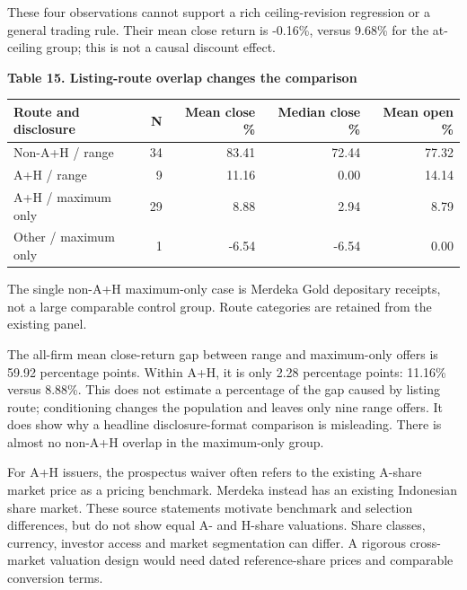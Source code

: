 \documentclass[10pt,a4paper]{article}
\begin{document}
{\footnotesize These four observations cannot support a rich ceiling-revision regression or a general trading rule. Their mean close return is -0.16\%, versus 9.68\% for the at-ceiling group; this is not a causal discount effect.}\par

\par\addvspace{5pt}\textbf{Table 15. Listing-route overlap changes the comparison}\par\nobreak\vspace{2pt}

{\small\renewcommand{\arraystretch}{1.10}\begin{tabularx}{\textwidth}{@{}Xrrrr@{}}\toprule

\textbf{Route and disclosure} & \textbf{N} & \textbf{Mean close \%} & \textbf{Median close \%} & \textbf{Mean open \%} \\\midrule

Non-A+H / range & 34 & 83.41 & 72.44 & 77.32 \\

A+H / range & 9 & 11.16 & 0.00 & 14.14 \\

A+H / maximum only & 29 & 8.88 & 2.94 & 8.79 \\

Other / maximum only & 1 & -6.54 & -6.54 & 0.00 \\

\bottomrule\end{tabularx}}\par

{\footnotesize The single non-A+H maximum-only case is Merdeka Gold depositary receipts, not a large comparable control group. Route categories are retained from the existing panel.}\par

The all-firm mean close-return gap between range and maximum-only offers is 59.92 percentage points. Within A+H, it is only 2.28 percentage points: 11.16\% versus 8.88\%. This does not estimate a percentage of the gap caused by listing route; conditioning changes the population and leaves only nine range offers. It does show why a headline disclosure-format comparison is misleading. There is almost no non-A+H overlap in the maximum-only group.

For A+H issuers, the prospectus waiver often refers to the existing A-share market price as a pricing benchmark. Merdeka instead has an existing Indonesian share market. These source statements motivate benchmark and selection differences, but do not show equal A- and H-share valuations. Share classes, currency, investor access and market segmentation can differ. A rigorous cross-market valuation design would need dated reference-share prices and comparable conversion terms.
\end{document}

